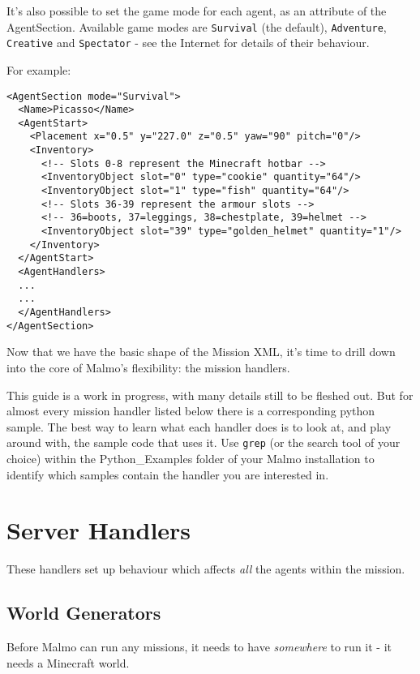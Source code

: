 \documentclass[11pt]{article} %
\begin{document}
It's also possible to set the game mode for each agent, as an attribute of the AgentSection. Available game modes are \lstinline!Survival! (the default), \lstinline!Adventure!, \lstinline!Creative! and \lstinline!Spectator! - see the Internet for details of their behaviour.

For example:

\begin{lstlisting}[frame=lines]
<AgentSection mode="Survival">
  <Name>Picasso</Name>
  <AgentStart>
    <Placement x="0.5" y="227.0" z="0.5" yaw="90" pitch="0"/>
    <Inventory>
      <!-- Slots 0-8 represent the Minecraft hotbar -->
      <InventoryObject slot="0" type="cookie" quantity="64"/>
      <InventoryObject slot="1" type="fish" quantity="64"/>
      <!-- Slots 36-39 represent the armour slots -->
      <!-- 36=boots, 37=leggings, 38=chestplate, 39=helmet -->
      <InventoryObject slot="39" type="golden_helmet" quantity="1"/>
    </Inventory>
  </AgentStart>
  <AgentHandlers>
  ...
  ...
  </AgentHandlers>
</AgentSection>
\end{lstlisting}

Now that we have the basic shape of the Mission XML, it's time to drill down into the core of Malmo's flexibility: the mission handlers.

\begin{mdframed}[style=tipFrame]
This guide is a work in progress, with many details still to be fleshed out. But for almost every mission handler listed below there is a corresponding python sample. The best way to learn what each handler does is to look at, and play around with, the sample code that uses it. Use \lstinline!grep! (or the search tool of your choice) within the Python\_Examples folder of your Malmo installation to identify which samples contain the handler you are interested in.
\end{mdframed}

\section{Server Handlers}

These handlers set up behaviour which affects \emph{all} the agents within the mission.

\subsection{World Generators}

Before Malmo can run any missions, it needs to have \emph{somewhere} to run it - it needs a Minecraft world.
\end{document}
